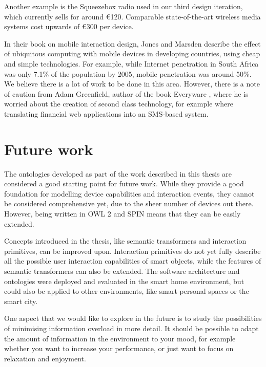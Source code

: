 Another example is the Squeezebox radio used in our third design iteration, which currently sells for around \euro 120. Comparable state-of-the-art wireless media systems cost upwards of \euro 300 per device.

In their book on mobile interaction design, Jones and Marsden \cite{Jones2006} describe the effect of ubiquitous computing with mobile devices in developing countries, using cheap and simple technologies.  For example, while Internet penetration in South Africa was only 7.1\% of the population by 2005, mobile penetration was around 50\%. We believe there is a lot of work to be done in this area. However, there is a note of caution from Adam Greenfield, author of the book Everyware \cite{Greenfield2006}, where he is worried about the creation of second class technology, for example where translating financial web applications into an SMS-based system.


\section{Future work}

The ontologies developed as part of the work described in this thesis are considered a good starting point for future work. While they provide a good foundation for modelling device capabilities and interaction events, they cannot be considered comprehensive yet, due to the sheer number of devices out there. However, being written in \ac{OWL} 2 and \ac{SPIN} means that they can be easily extended.

Concepts introduced in the thesis, like semantic transformers and interaction primitives, can be improved upon. Interaction primitives do not yet fully describe all the possible user interaction capabilities of smart objects, while the features of semantic transformers can also be extended. The software architecture and ontologies were deployed and evaluated in the smart home environment, but could also be applied to other environments, like smart personal spaces or the smart city.

One aspect that we would like to explore in the future is to study the possibilities of minimising information overload in more detail. It should be possible to adapt the amount of information in the environment to your mood, for example whether you want to increase your performance, or just want to focus on relaxation and enjoyment.


